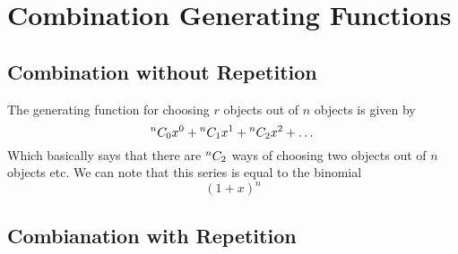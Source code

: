 \section{Combination Generating Functions}

\subsection{Combination without Repetition}

The generating function for choosing \mbox{$r$} objects out of \mbox{$n$} objects is given by
\[
    {}^{n}C_{0}x^0 + {}^{n}C_{1}x^1 + {}^{n}C_{2}x^2 + \dots
\]
Which basically says that there are \mbox{${}^{n}C_{2}$} ways of choosing two objects out of \mbox{$n$} objects etc.
We can note that this series is equal to the binomial
\[
    (1+x)^n
\]

\subsection{Combianation with Repetition}
